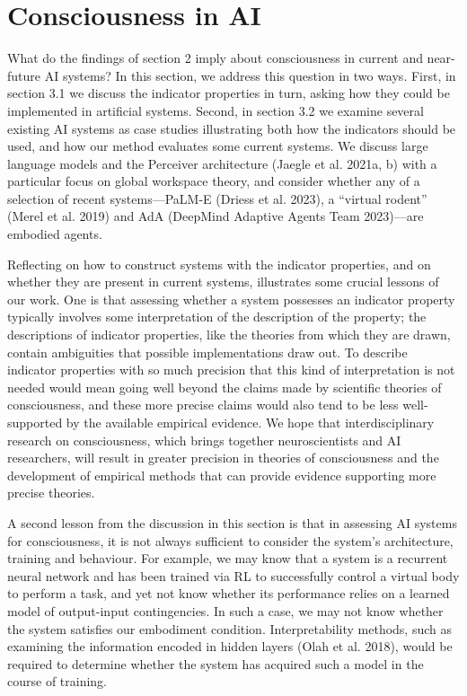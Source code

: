 \documentclass[12pt]{article}
\begin{document}
\newpage

\section{Consciousness in AI}

What do the findings of section 2 imply about consciousness in current and near-future AI systems? In this section, we address this question in two ways. First, in section 3.1 we discuss the indicator properties in turn, asking how they could be implemented in artificial systems. Second, in section 3.2 we examine several existing AI systems as case studies illustrating both how the indicators should be used, and how our method evaluates some current systems. We discuss large language models and the Perceiver architecture (Jaegle et al. 2021a, b) with a particular focus on global workspace theory, and consider whether any of a selection of recent systems—PaLM-E (Driess et al. 2023), a ``virtual rodent'' (Merel et al. 2019) and AdA (DeepMind Adaptive Agents Team 2023)—are embodied agents.

Reflecting on how to construct systems with the indicator properties, and on whether they are present in current systems, illustrates some crucial lessons of our work. One is that assessing whether a system possesses an indicator property typically involves some interpretation of the description of the property; the descriptions of indicator properties, like the theories from which they are drawn, contain ambiguities that possible implementations draw out. To describe indicator properties with so much precision that this kind of interpretation is not needed would mean going well beyond the claims made by scientific theories of consciousness, and these more precise claims would also tend to be less well-supported by the available empirical evidence. We hope that interdisciplinary research on consciousness, which brings together neuroscientists and AI researchers, will result in greater precision in theories of consciousness and the development of empirical methods that can provide evidence supporting more precise theories.

A second lesson from the discussion in this section is that in assessing AI systems for consciousness, it is not always sufficient to consider the system’s architecture, training and behaviour. For example, we may know that a system is a recurrent neural network and has been trained via RL to successfully control a virtual body to perform a task, and yet not know whether its performance relies on a learned model of output-input contingencies. In such a case, we may not know whether the system satisfies our embodiment condition. Interpretability methods, such as examining the information encoded in hidden layers (Olah et al. 2018), would be required to determine whether the system has acquired such a model in the course of training.
\end{document}
